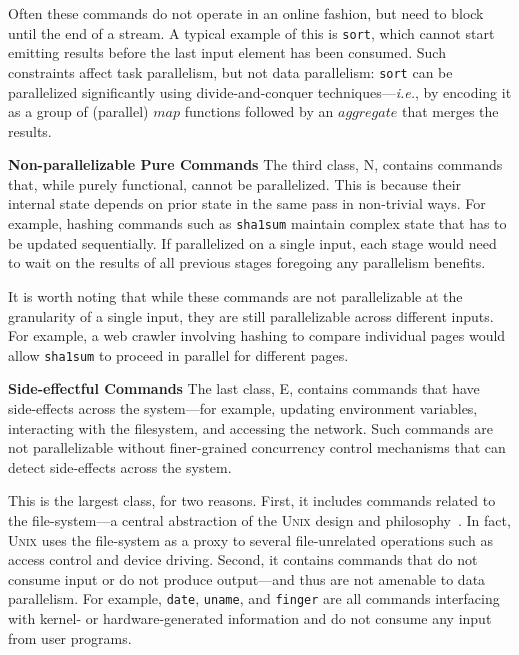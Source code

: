 \documentclass[sigplan, review, screen, anonymous]{acmart}
\newcommand{\ie}{{\em i.e.}, }
\newcommand{\heading}[1]{\vspace{4pt}\noindent\textbf{#1}\enspace}
\newcommand{\ttt}[1]{\texttt{#1}}
\newcommand{\cn}[1]{\mbox{\textcircled{\footnotesize #1}}}
\newcommand{\npu}{\cn{\textsc{N}}\xspace}
\newcommand{\sid}{\cn{\textsc{E}}\xspace}
\newcommand{\nv}[1]{[{\color{cyan}nv: #1}]}
\newcommand{\kk}[1]{[{\color{magenta}kk: #1}]}
\newcommand{\unix}{{\scshape Unix}\xspace}
\begin{document}
Often these commands do not operate in an online fashion, but need to block until the end of a stream.
A typical example of this is \ttt{sort}, which cannot start emitting results before the last input element has been consumed.
Such constraints affect task parallelism, but not data parallelism:
  \ttt{sort} can be parallelized significantly using divide-and-conquer techniques---\ie by encoding it as a group of (parallel) $map$ functions followed by an $aggregate$ that merges the results.


\heading{Non-parallelizable Pure Commands}
The third class, \npu, contains commands that, while purely functional, cannot be parallelized.
This is because their internal state depends on prior state in the same pass in non-trivial ways. %
For example, hashing commands such as \ttt{sha1sum} maintain complex state that has to be updated sequentially.
If parallelized on a single input, each stage would need to wait on the results of all previous stages foregoing any parallelism benefits.

It is worth noting that while these commands are not parallelizable at the granularity of a single input, they are still parallelizable across different inputs.
For example, a web crawler involving hashing to compare individual pages would allow \ttt{sha1sum} to proceed in parallel for different pages.

\heading{Side-effectful Commands}
The last class, \sid, contains commands that have side-effects across the system---for example, updating environment variables, interacting with the filesystem, and accessing the network.
Such commands are not parallelizable without finer-grained concurrency control mechanisms that can detect side-effects across the system.

This is the largest class, for two reasons.
First, it includes commands related to the file-system---a central abstraction of the \unix design and philosophy~\cite{unix}.
In fact, \unix uses the file-system as a proxy to several file-unrelated operations such as access control and device driving. %
Second, it contains commands that do not consume input or do not produce output---and thus are not amenable to data parallelism.
For example, \ttt{date}, \ttt{uname}, and \ttt{finger} are all commands interfacing with kernel- or hardware-generated information and do not consume any input from user programs.
\end{document}
